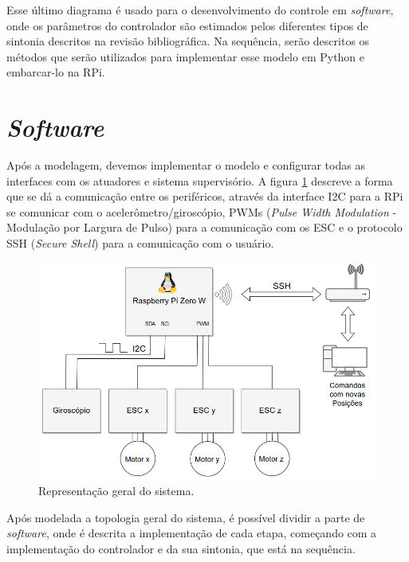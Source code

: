 Esse último diagrama é usado para o desenvolvimento do controle em \textit{software}, onde os parâmetros do controlador são estimados pelos diferentes tipos de sintonia descritos na revisão bibliográfica. Na sequência, serão descritos os métodos que serão utilizados para implementar esse modelo em Python e embarcar-lo na RPi.



\section{\textit{Software}}

Após a modelagem, devemos implementar o modelo e configurar todas as interfaces com os atuadores e sistema supervisório. A figura \ref{fig:comunicacao_projeto} descreve a forma que se dá a comunicação entre os periféricos, através da interface I2C para a RPi se comunicar com o acelerômetro/giroscópio, PWMs (\textit{Pulse Width Modulation} - Modulação por Largura de Pulso) para a comunicação com os ESC e o protocolo SSH (\textit{Secure Shell}) para a comunicação com o usuário.

\begin{figure}[H]
  \caption{Representação geral do sistema.}
  \begin{center}
      \includegraphics[scale=.75]{metodologia/img/comunicacao_projeto}
  \end{center}
  \label{fig:comunicacao_projeto}
\end{figure}


Após modelada a topologia geral do sistema, é possível dividir a parte de \textit{software}, onde é descrita a implementação de cada etapa, começando com a implementação do controlador e da sua sintonia, que está na sequência.


